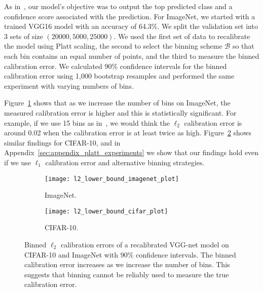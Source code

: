 As in~\cite{guo2017calibration}, our model's objective was to output the top predicted class and a confidence score associated with the prediction. For ImageNet, we started with a trained VGG16 model with an accuracy of 64.3\%. We split the validation set into 3 sets of size $(20000, 5000, 25000)$. We used the first set of data to recalibrate the model using Platt scaling, the second to select the binning scheme $\mathcal{B}$ so that each bin contains an equal number of points, and the third to measure the binned calibration error. We calculated $90\%$ confidence intervals for the binned calibration error using 1,000 bootstrap resamples and performed the same experiment with varying numbers of bins.

Figure~\ref{fig:imagenet_lower_bound} shows that as we increase the number of bins on ImageNet, the measured calibration error is higher and this is statistically significant. For example, if we use 15 bins as in~\cite{guo2017calibration}, we would think the $\ell_2$ calibration error is around 0.02 when the calibration error is at least twice as high. Figure~\ref{fig:cifar_10_lower_bound} shows similar findings for CIFAR-10, and in Appendix~\ref{sec:appendix_platt_experiments} we show that our findings hold even if we use $\ell_1$ calibration error and alternative binning strategies.

\begin{figure}
     \centering
     \begin{subfigure}[b]{0.4\textwidth}
         \centering
         \texttt{[image: l2\_lower\_bound\_imagenet\_plot]}
         \caption{ImageNet.}
         \label{fig:imagenet_lower_bound}
     \end{subfigure}
     \hfill
     \begin{subfigure}[b]{0.4\textwidth}
         \centering
         \texttt{[image: l2\_lower\_bound\_cifar\_plot]}
         \caption{CIFAR-10.}
         \label{fig:cifar_10_lower_bound}
     \end{subfigure}
        \caption{
        Binned $\ell_2$ calibration errors of a recalibrated VGG-net model on CIFAR-10 and ImageNet with $90\%$ confidence intervals. The binned calibration error increases as we increase the number of bins. This suggests that binning cannot be reliably used to measure the true calibration error.
        }
        \label{fig:lower_bounds}
\end{figure}



